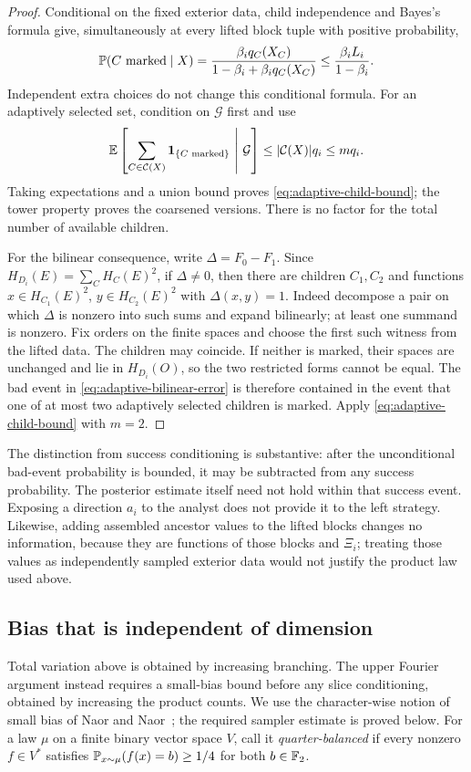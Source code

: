 \begin{proof}
Conditional on the fixed exterior data, child independence and Bayes's
formula give, simultaneously at every lifted block tuple with positive
probability,
\[
 \mathbb P(C\text{ marked}\mid X)
 =\frac{\beta_iq_C(X_C)}{1-\beta_i+\beta_iq_C(X_C)}
 \le\frac{\beta_iL_i}{1-\beta_i}.
\]
Independent extra choices do not change this conditional formula.  For an
adaptively selected set, condition on $\mathcal G$ first and use
\[
 \mathbb E\left[\sum_{C\in\mathcal C(X)}
             \mathbf 1_{\{C\text{ marked}\}}\ \middle|\ \mathcal G\right]
 \le |\mathcal C(X)|q_i\le m q_i.
\]
Taking expectations and a union bound proves
\eqref{eq:adaptive-child-bound}; the tower property proves the coarsened
versions.  There is no factor for the total number of available children.

For the bilinear consequence, write $\Delta=F_0-F_1$.  Since
$H_{D_i}(E)=\sum_C H_C(E)^2$, if $\Delta\ne0$, then there are children
$C_1,C_2$ and functions $x\in H_{C_1}(E)^2$, $y\in H_{C_2}(E)^2$ with
$\Delta(x,y)=1$.  Indeed decompose a pair on which $\Delta$ is nonzero into
such sums and expand bilinearly; at least one summand is nonzero.  Fix orders
on the finite spaces and choose the first such witness from the lifted data.
The children may coincide.  If neither is marked, their spaces are unchanged
and lie in $H_{D_i}(O)$, so the two restricted forms cannot be equal.  The
bad event in \eqref{eq:adaptive-bilinear-error} is therefore contained in the
event that one of at most two adaptively selected children is marked.
Apply \eqref{eq:adaptive-child-bound} with $m=2$.
\end{proof}

The distinction from success conditioning is substantive: after the
unconditional bad-event probability is bounded, it may be subtracted from
any success probability.  The posterior estimate itself need not hold within
that success event.  Exposing a direction $a_i$ to the analyst does not
provide it to the left strategy.  Likewise, adding assembled ancestor values to the
lifted blocks changes no information, because they are functions of those
blocks and $\Xi_i$; treating those values as independently sampled exterior
data would not justify the product law used above.

\subsection{Bias that is independent of dimension}

Total variation above is obtained by increasing branching.  The upper
Fourier argument instead requires a small-bias bound before any slice
conditioning, obtained by increasing the product counts.  We use the
character-wise notion of small bias of Naor and Naor~\cite{NaorNaor1993};
the required sampler estimate is proved below.  For a law $\mu$
on a finite binary vector space $V$, call it \emph{quarter-balanced} if every
nonzero $f\in V^*$ satisfies
$\mathbb P_{x\sim\mu}(f(x)=b)\ge1/4$ for both $b\in\mathbb F_2$.

